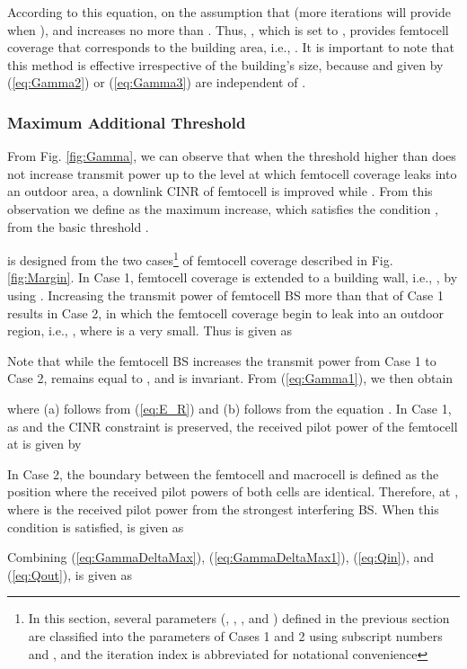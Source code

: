 \documentclass[draftclsnofoot,12pt,onecolumn]{IEEEtran}
\begin{document}
According to this equation,  on the assumption that 
(more iterations will provide  when ), and  increases no more than
. Thus, , which is set to , provides
femtocell coverage that corresponds to the building area, i.e.,
. It is important to note that this method is
effective irrespective of the building's size, because  and
 given by (\ref{eq:Gamma2}) or
(\ref{eq:Gamma3}) are independent of .


\subsubsection{Maximum Additional Threshold }
From Fig. \ref{fig:Gamma}, we can observe that when the threshold
 higher than  does not increase transmit power  up to the level at which femtocell coverage leaks into an outdoor area, a downlink
CINR of femtocell is improved while . From this observation we define  as the maximum increase, which satisfies the condition , from the basic threshold .

 is
designed from the two cases\footnote{In this section, several parameters (,
, , and ) defined in the previous
section are classified into the parameters of Cases 1 and 2 using
subscript numbers  and , and the iteration index  is
abbreviated for notational convenience} of femtocell coverage described in Fig. \ref{fig:Margin}. In Case 1, femtocell coverage is extended to a
building wall, i.e., , by using .
Increasing the transmit power of femtocell BS more than that of Case
1 results in Case 2, in which the femtocell coverage begin to leak into
an outdoor region, i.e., , where  is a
very small. Thus  is given as

Note that while the femtocell BS
increases the transmit power from Case 1 to Case 2,  remains
equal to , and  is invariant. From (\ref{eq:Gamma1}), we then obtain

where (a) follows from (\ref{eq:E_R}) and (b) follows from the equation
.
In Case 1, as  and the CINR constraint
 is preserved, the received
pilot power of the femtocell at  is given by

In Case 2, the boundary between the femtocell and macrocell is
defined as the position where the received pilot powers of both
cells are identical. Therefore,  at , where  is
the received pilot power from the strongest interfering BS. When
this condition is satisfied,  is given as

Combining (\ref{eq:GammaDeltaMax}), (\ref{eq:GammaDeltaMax1}), (\ref{eq:Qin}), and (\ref{eq:Qout}),
 is given as
\end{document}
